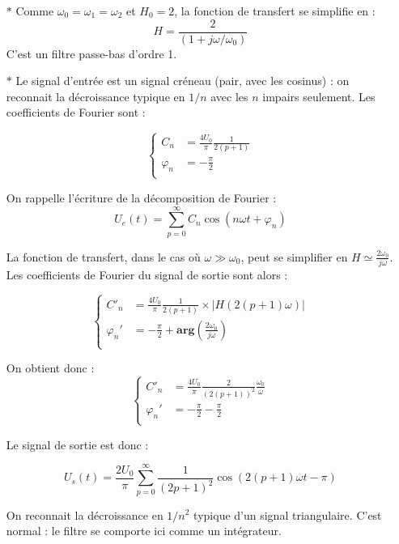\documentclass{report}
\begin{document}
\begin{itemize}
	\item[$\ast$] Comme $\omega_0=\omega_1=\omega_2$ et $H_0=2$, la fonction de transfert se simplifie en : 
\begin{equation}
	H=\frac{2}{(1+j\omega/\omega_0)}
\end{equation}	
C'est un filtre passe-bas d'ordre 1.

\item[$\ast$] Le signal d'entrée est un signal créneau (pair, avec les cosinus) : on reconnait la décroissance typique en $1/n$ avec les $n$ impairs seulement. Les coefficients de Fourier sont :

\begin{equation}
	\left\lbrace
	\begin{array}{lll}
		C_n &= \frac{4U_0}{\pi}\frac{1}{2(p+1)}\\
		\varphi_n &= -\frac{\pi}{2} \\
	\end{array}\right.
\end{equation}

On rappelle l'écriture de la décomposition de Fourier :
\begin{equation}
	U_e(t) = \sum_{p=0}^{\infty}C_n\cos(n\omega t+\varphi_n)
\end{equation}

La fonction de transfert, dans le cas où $\omega\gg\omega_0$, peut se simplifier en $H\simeq\frac{2\omega_0}{j\omega}$. Les coefficients de Fourier du signal de sortie sont alors : 

\begin{equation}
	\left\lbrace
	\begin{array}{lll}
		C'_n & = \frac{4U_0}{\pi}\frac{1}{2(p+1)}\times |H(2(p+1)\omega)|\\

		\varphi_n' &= -\frac{\pi}{2}+\mathbf{arg}\left(\frac{2\omega_0}{j\omega} \right)  \\
	\end{array}\right.
\end{equation}

On obtient donc :
\begin{equation}
	\left\lbrace
	\begin{array}{lll}
		C'_n & = \frac{4U_0}{\pi}\frac{2}{(2(p+1))^2}\frac{\omega_0}{\omega}\\
		\varphi_n' &= -\frac{\pi}{2}-\frac{\pi}{2} \\
	\end{array}\right.
\end{equation}

Le signal de sortie est donc :

\begin{equation}
	U_s(t) = \frac{2U_0}{\pi}\sum_{p=0}^{\infty}\frac{1}{(2p+1)^2}\cos(2(p+1)\omega t -\pi)
\end{equation}

On reconnait la décroissance en $1/n^2$ typique d'un signal triangulaire. C'est normal : le filtre se comporte ici comme un intégrateur.

\end{itemize}
\end{document}
